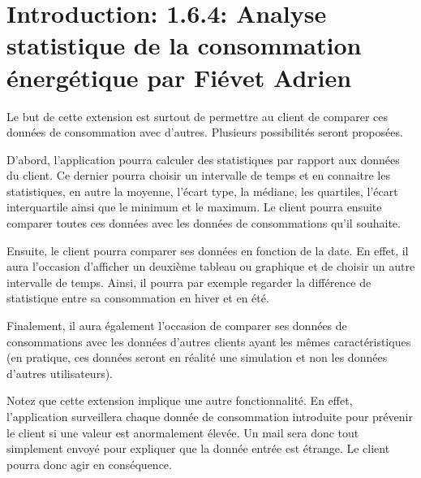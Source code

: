 \section{Introduction: 1.6.4: Analyse statistique de la consommation énergétique par Fiévet Adrien}

\begin{flushleft}
Le but de cette extension est surtout de permettre au client de comparer ces données de consommation avec d'autres. Plusieurs possibilités seront proposées.
\end{flushleft}

\begin{flushleft}
D'abord, l'application pourra calculer des statistiques par rapport aux données du client. Ce dernier pourra choisir un intervalle de temps et en connaitre les statistiques, en autre la moyenne, l'écart type, la médiane, les quartiles, l'écart interquartile ainsi que le minimum et le maximum. Le client pourra ensuite comparer toutes ces données avec les données de consommations qu'il souhaite.
\end{flushleft}

\begin{flushleft}
Ensuite, le client pourra comparer ses données en fonction de la date. En effet, il aura l'occasion d'afficher un deuxième tableau ou graphique et de choisir un autre intervalle de temps. Ainsi, il pourra par exemple regarder la différence de statistique entre sa consommation en hiver et en été.
\end{flushleft}

\begin{flushleft}
Finalement, il aura également l'occasion de comparer ses données de consommations avec les données d'autres clients ayant les mêmes caractéristiques (en pratique, ces données seront en réalité une simulation et non les données d'autres utilisateurs).
\end{flushleft}

\begin{flushleft}
Notez que cette extension implique une autre fonctionnalité. En effet, l'application surveillera chaque donnée de consommation introduite pour prévenir le client si une valeur est anormalement élevée. Un mail sera donc tout simplement envoyé pour expliquer que la donnée entrée est étrange. Le client pourra donc agir en conséquence.
\end{flushleft}
